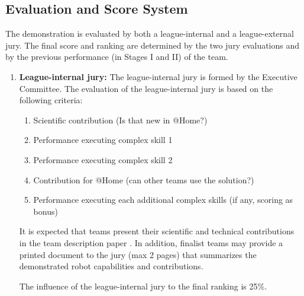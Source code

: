 \subsection{Evaluation and Score System}
The demonstration is evaluated by both a league-internal and a league-external jury. The final score and ranking are determined by the two jury evaluations and by the previous performance (in Stages I and II) of the team.

\begin{enumerate}
  \item \textbf{League-internal jury:} The league-internal jury is formed by the Executive Committee.
  The evaluation of the league-internal jury is based on the following criteria:
  \begin{enumerate}
    \item Scientific contribution (Is that new in @Home?)
    \item Performance executing complex skill 1
    \item Performance executing complex skill 2
    \item Contribution for @Home (can other teams use the solution?)
    \item Performance executing each additional complex skills (if any, scoring as bonus)

  \end{enumerate}
  It is expected that teams present their scientific and technical contributions in
  the team description paper .
  In addition, finalist teams may provide a printed document to the jury (max 2 pages) that summarizes the demonstrated robot capabilities and contributions.

  The influence of the league-internal jury to the final ranking is 25\%. \\


\end{enumerate}

